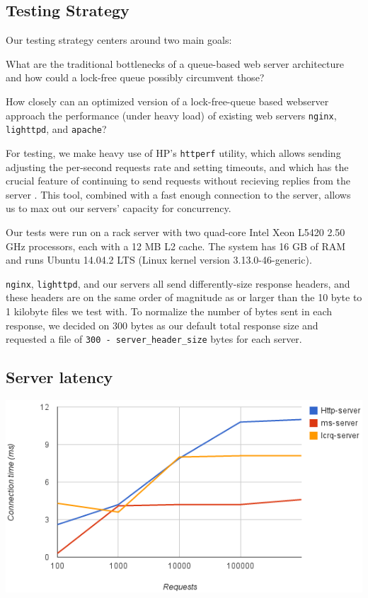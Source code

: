\documentclass[twoside,10pt]{article}
\newenvironment{Figure}
  {\par\medskip\noindent\minipage{\linewidth}}
  {\endminipage\par\medskip}
\begin{document}
\begin{multicols}{2}
\section{Testing Strategy}

Our testing strategy centers around two main goals:

\begin{compactitem}
\item What are the traditional bottlenecks of a queue-based web server
  architecture and how could a lock-free queue possibly circumvent
  those?
\item How closely can an optimized version of a lock-free-queue based
  webserver approach the performance (under heavy load) of existing
  web servers \verb+nginx+, \verb+lighttpd+, and \verb+apache+?
\end{compactitem}

For testing, we make heavy use of HP's \verb+httperf+ utility, which
allows sending adjusting the per-second requests rate and setting
timeouts, and which has the crucial feature of continuing to send
requests without recieving replies from the server
\cite{mosberger1998httperf}. This tool, combined with a fast enough
connection to the server, allows us to max out our servers' capacity
for concurrency.

Our tests were run on a rack server with two quad-core Intel Xeon
L5420 2.50 GHz processors, each with a 12 MB L2 cache. The system has
16 GB of RAM and runs Ubuntu 14.04.2 LTS (Linux kernel version
3.13.0-46-generic).

\verb+nginx+, \verb+lighttpd+, and our servers all send
differently-size response headers, and these headers are on the same
order of magnitude as or larger than the 10 byte to 1 kilobyte files
we test with. To normalize the number of bytes sent in each response,
we decided on 300 bytes as our default total response size and
requested a file of \verb+300 - server_header_size+ bytes for each
server.

\subsection{Server latency}

\begin{Figure}
\includegraphics[width=\linewidth]{img/max-latency.png}
\end{Figure}


\end{multicols}
\end{document}
